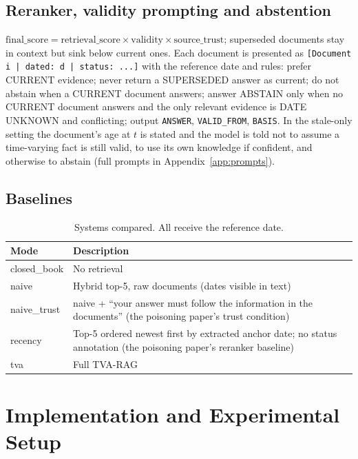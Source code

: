 \documentclass[11pt,a4paper]{report}
\begin{document}
\section{Reranker, validity prompting and abstention}
$\text{final\_score} = \text{retrieval\_score} \times \text{validity} \times \text{source\_trust}$; superseded documents stay in context but sink below current ones. Each document is presented as \texttt{[Document i | dated: d | status: ...]} with the reference date and rules: prefer CURRENT evidence; never return a SUPERSEDED answer as current; do not abstain when a CURRENT document answers; answer ABSTAIN only when no CURRENT document answers and the only relevant evidence is DATE UNKNOWN and conflicting; output \texttt{ANSWER}, \texttt{VALID\_FROM}, \texttt{BASIS}. In the stale-only setting the document's age at $t$ is stated and the model is told not to assume a time-varying fact is still valid, to use its own knowledge if confident, and otherwise to abstain (full prompts in Appendix~\ref{app:prompts}).

\section{Baselines}
\begin{table}[htbp]\centering\caption{Systems compared. All receive the reference date.}\small
\begin{tabularx}{\linewidth}{l X}\toprule\rowcolor{cIngest}\textbf{Mode}&\textbf{Description}\\\midrule
closed\_book & No retrieval\\
naive & Hybrid top-5, raw documents (dates visible in text)\\
naive\_trust & naive + ``your answer must follow the information in the documents'' (the poisoning paper's trust condition)\\
recency & Top-5 ordered newest first by extracted anchor date; no status annotation (the poisoning paper's reranker baseline)\\
tva & Full TVA-RAG\\\bottomrule\end{tabularx}\end{table}

\chapter{Implementation and Experimental Setup}
\end{document}
